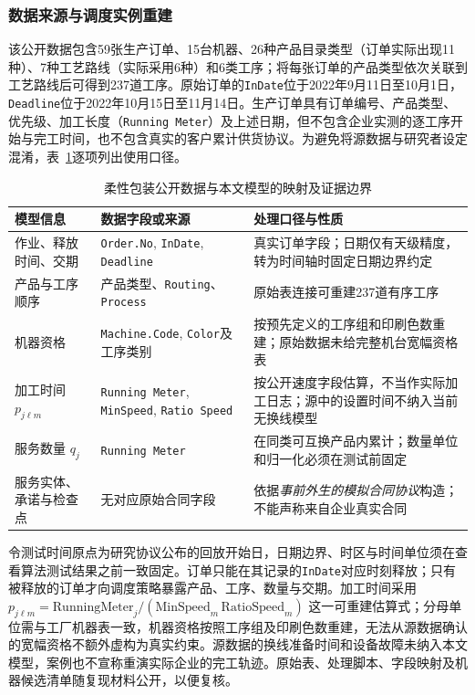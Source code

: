 \subsubsection{数据来源与调度实例重建}

该公开数据包含59张生产订单、15台机器、26种产品目录类型（订单实际出现11种）、7种工艺路线（实际采用6种）和6类工序；将每张订单的产品类型依次关联到工艺路线后可得到237道工序。原始订单的\texttt{InDate}位于2022年9月11日至10月1日，\texttt{Deadline}位于2022年10月15日至11月14日。生产订单具有订单编号、产品类型、优先级、加工长度（\texttt{Running Meter}）及上述日期，但不包含企业实测的逐工序开始与完工时间，也不包含真实的客户累计供货协议。为避免将源数据与研究者设定混淆，表~\ref{tab:industrial_data_mapping}逐项列出使用口径。

\begin{table}[t]
  \centering
  \caption{柔性包装公开数据与本文模型的映射及证据边界}\label{tab:industrial_data_mapping}
  \footnotesize
  \setlength{\tabcolsep}{4pt}
  \begin{tabular}{@{}p{3.1cm}p{4.1cm}p{6.4cm}@{}}
    \toprule
    模型信息 & 数据字段或来源 & 处理口径与性质 \\
    \midrule
    作业、释放时间、交期 & \texttt{Order.No}, \texttt{InDate}, \texttt{Deadline} & 真实订单字段；日期仅有天级精度，转为时间轴时固定日期边界约定 \\
    产品与工序顺序 & 产品类型、\texttt{Routing}、\texttt{Process} & 原始表连接可重建237道有序工序 \\
    机器资格 & \texttt{Machine.Code}, \texttt{Color}及工序类别 & 按预先定义的工序组和印刷色数重建；原始数据未给完整机台宽幅资格表 \\
    加工时间 $p_{j\ell m}$ & \texttt{Running Meter}, \texttt{MinSpeed}, \texttt{Ratio Speed} & 按公开速度字段估算，不当作实际加工日志；源中的设置时间不纳入当前无换线模型 \\
    服务数量 $q_j$ & \texttt{Running Meter} & 在同类可互换产品内累计；数量单位和归一化必须在测试前固定 \\
    服务实体、承诺与检查点 & 无对应原始合同字段 & 依据\emph{事前外生的模拟合同协议}构造；不能声称来自企业真实合同 \\
    \bottomrule
  \end{tabular}
\end{table}

令测试时间原点为研究协议公布的回放开始日，日期边界、时区与时间单位须在查看算法测试结果之前一致固定。订单只能在其记录的\texttt{InDate}对应时刻释放；只有被释放的订单才向调度策略暴露产品、工序、数量与交期。加工时间采用 \(p_{j\ell m}=\mathrm{RunningMeter}_j/(\mathrm{MinSpeed}_m\,\mathrm{RatioSpeed}_m)\) 这一可重建估算式；分母单位需与工厂机器表一致，机器资格按照工序组及印刷色数重建，无法从源数据确认的宽幅资格不额外虚构为真实约束。源数据的换线准备时间和设备故障未纳入本文模型，案例也不宣称重演实际企业的完工轨迹。原始表、处理脚本、字段映射及机器候选清单随复现材料公开，以便复核。

